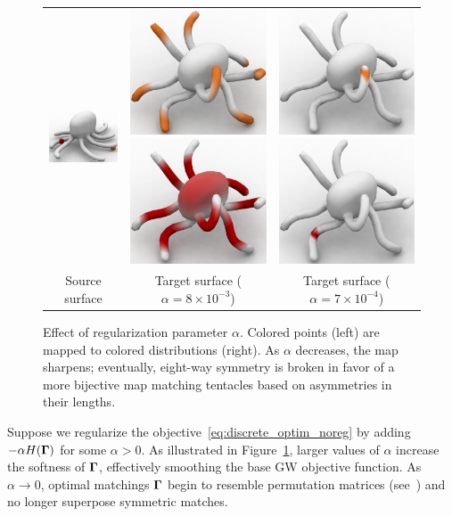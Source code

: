 \begin{figure}[t]\centering
\begin{tabular}{c|c|c}
\includegraphics[height=.16\linewidth]{figures/regularization/source_octopus.pdf} &
\includegraphics[height=.16\linewidth]{figures/regularization/target_octopus1_0.008.pdf}
\includegraphics[height=.16\linewidth]{figures/regularization/target_octopus2_0.008.pdf}
&
\includegraphics[height=.16\linewidth]{figures/regularization/target_octopus1_0.0007.pdf}
\includegraphics[height=.16\linewidth]{figures/regularization/target_octopus2_0.0007.pdf}
\\
Source surface
& Target surface ($\alpha=8\times10^{-3}$)
& Target surface ($\alpha=7\times10^{-4}$)
\end{tabular}
\caption{Effect of regularization parameter $\alpha$.  Colored points (left) are mapped to colored distributions (right).  As $\alpha$ decreases, the map sharpens; eventually, eight-way symmetry is broken in favor of a more bijective map matching tentacles based on asymmetries in their lengths.\vspace{-.2in}}\label{fig:reg}
\end{figure}
Suppose we regularize the objective~\eqref{eq:discrete_optim_noreg} by adding $-\alpha H(\mathbf \Gamma)$ for some  $\alpha>0$.  As illustrated in Figure~\ref{fig:reg}, larger values of $\alpha$ increase the softness of $\mathbf \Gamma$, effectively smoothing the base GW objective function.  As $\alpha\rightarrow0$, optimal matchings $\mathbf \Gamma$ begin to resemble permutation matrices (see~\cite[eq.\ (10)]{quadrianto-2009}) and no longer superpose symmetric matches.

